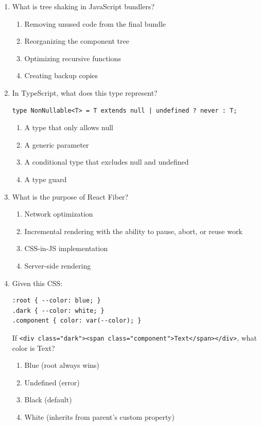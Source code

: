 \documentclass[12pt,a4paper]{article}
\begin{document}
\begin{enumerate}
\item What is tree shaking in JavaScript bundlers?
\begin{enumerate}[label=\Alph*)]
    \item Removing unused code from the final bundle
    \item Reorganizing the component tree
    \item Optimizing recursive functions
    \item Creating backup copies
\end{enumerate}

\item In TypeScript, what does this type represent?
\begin{verbatim}
type NonNullable<T> = T extends null | undefined ? never : T;
\end{verbatim}
\begin{enumerate}[label=\Alph*)]
    \item A type that only allows null
    \item A generic parameter
    \item A conditional type that excludes null and undefined
    \item A type guard
\end{enumerate}

\item What is the purpose of React Fiber?
\begin{enumerate}[label=\Alph*)]
    \item Network optimization
    \item Incremental rendering with the ability to pause, abort, or reuse work
    \item CSS-in-JS implementation
    \item Server-side rendering
\end{enumerate}

\item Given this CSS:
\begin{verbatim}
:root { --color: blue; }
.dark { --color: white; }
.component { color: var(--color); }
\end{verbatim}
If \texttt{<div class="dark"><span class="component">Text</span></div>}, what color is Text?
\begin{enumerate}[label=\Alph*)]
    \item Blue (root always wins)
    \item Undefined (error)
    \item Black (default)
    \item White (inherits from parent's custom property)
\end{enumerate}


\end{enumerate}
\end{document}
